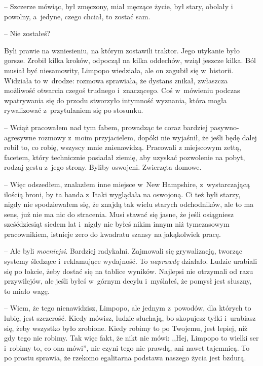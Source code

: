 \documentclass[oneside,polish,11pt,sfheadings]{mwbk}
\begin{document}
-- Szczerze mówiąc, był zmęczony, miał męczące życie, był stary, obolały
i powolny, a~jedyne, czego chciał, to zostać sam.

-- Nie zostałeś? 

Byli prawie na wzniesieniu, na którym zostawili
traktor. Jego utykanie było gorsze. Zrobił kilka kroków, odpoczął na
kilka oddechów, wziął jeszcze kilka. Ból musiał być niesamowity, Limpopo
wiedziała, ale on zagubił się w~historii. Widziała to w~drodze: rozmowa
sprawiała, że dystans znikał, zwłaszcza możliwość otwarcia czegoś
trudnego i~znaczącego. Coś w~mówieniu podczas wpatrywania się do przodu
stworzyło intymność wyznania, która mogła rywalizować z~przytulaniem się
po stosunku.

-- Wciąż pracowałem nad tym fabem, prowadząc te coraz bardziej
pasywno-agresywne rozmowy z~moim przyjacielem, dopóki nie wyjaśnił, że
jeśli będę dalej robił to, co robię, wszyscy mnie znienawidzą. Pracowali
z miejscowym zettą, facetem, który technicznie posiadał ziemię, aby
uzyskać pozwolenie na pobyt, rodzaj gestu z~jego strony. Byliby
oswojeni. Zwierzęta domowe.

-- Więc odszedłem, znalazłem inne miejsce w~New Hampshire, z~wystarczającą ilością broni, by ta banda z~Itaki wyglądała na oswojoną.
Ci też byli starzy, nigdy nie spodziewałem się, że znajdą tak wielu
starych odchodników, ale to ma sens, już nie ma nic do stracenia. Musi
stawać się jasne, że jeśli osiągniesz sześćdziesiąt siedem lat i~nigdy
nie byłeś nikim innym niż tymczasowym pracownikiem, istnieje zero do
kwadratu szansy na jakąkolwiek pracę.

-- Ale byli \textit{mocniejsi}. Bardziej radykalni. Zajmowali się
grywalizacją, tworząc systemy śledzące i~reklamujące wydajność. To
\textit{naprawdę }działało. Ludzie urabiali się po łokcie, żeby dostać się
na tablice wyników. Najlepsi nie otrzymali od razu przywilejów, ale
jeśli byłeś w~górnym decylu i~myślałeś, że pomysł jest słuszny, to miało
wagę.

-- Wiem, że tego nienawidzisz, Limpopo, ale jednym z~powodów, dla których
to lubię, jest szczerość. Kiedy mówisz, ludzie słuchają, bo skopujesz
tyłki i~urabiasz się, żeby wszystko było zrobione. Kiedy robimy to po
Twojemu, jest lepiej, niż gdy tego nie robimy. Tak więc fakt, że nikt
nie mówi: ,,Hej, Limpopo to wielki ser i~robimy to, co ona mówi'', nie
czyni tego nie prawdą, ani nawet tajemnicą. To po prostu sprawia, że
rzekomo egalitarna podstawa naszego życia jest bzdurą.
\end{document}
